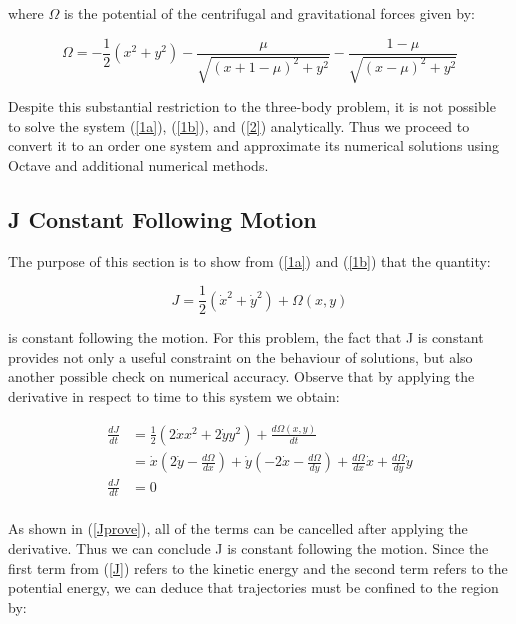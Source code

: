 \documentclass{article}
\begin{document}
where $\Omega$ is the potential of the centrifugal and gravitational forces given by:

\begin{equation}\label{2}
\Omega = - \frac{1}{2} (x^2 + y^2) - \frac{\mu}{\sqrt{(x+1-\mu)^2+y^2}} - \frac{1 - \mu}{\sqrt{(x-\mu)^2+y^2}}
\end{equation}

Despite this substantial restriction to the three-body problem, it is not possible to solve the system (\ref{1a}), (\ref{1b}), and (\ref{2}) analytically. Thus we proceed to convert it to an order one system and approximate its numerical solutions using Octave and additional numerical methods.

\subsection{J Constant Following Motion}

The purpose of this section is to show from (\ref{1a}) and (\ref{1b}) that the quantity:

\begin{equation}\label{J}
J = \frac{1}{2} (\dot{x}^2 + \dot{y}^2) + \Omega(x,y)
\end{equation}

is constant following the motion. For this problem, the fact that J is constant provides not only a useful constraint
on the behaviour of solutions, but also another possible check on numerical accuracy. Observe that by applying the derivative in respect to time to this system we obtain:

\begin{equation}\label{Jprove}
        \begin{split}
            \frac{dJ}{dt} & = \frac{1}{2} (2\dot{x} x^2 + 2\dot{y}y^2) + \frac{d\Omega(x,y)}{dt} \\
           & = \dot{x} (2\dot{y} - \frac{d\Omega}{dx}) + \dot{y}(-2\dot{x} - \frac{d\Omega}{dy}) + \frac{d\Omega}{dx}\dot{x} + \frac{d\Omega}{dy}\dot{y} \\ 
           \frac{dJ}{dt} & = 0 \\                 
        \end{split}
\end{equation}

As shown in (\ref{Jprove}), all of the terms can be cancelled after applying the derivative. Thus we can conclude J is constant following the motion. Since the first term from (\ref{J}) refers to the kinetic energy and the second term refers to the potential energy, we can deduce that trajectories must be confined to the region by:
\end{document}

